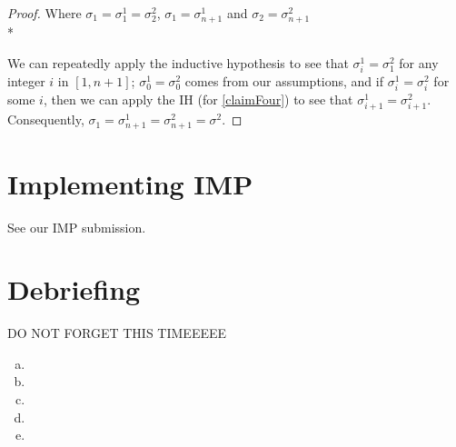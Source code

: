 \documentclass[10pt]{article}
\newcommand{\problem}[1]{\section{\sf #1}}
\begin{document}
\begin{enumerate}[(a)]
\begin{proof}
    Where $\sigma_1 = \sigma^1_1 = \sigma^2_2$, $\sigma_1 = \sigma^1_{n+1}$ and
    $\sigma_2 = \sigma^2_{n+1}$ \\*

    We can repeatedly apply the inductive hypothesis to see that $\sigma^1_i
    = \sigma^2_1$ for any integer $i$ in $[1, n+1]$; $\sigma^1_0 =
    \sigma^2_0$ comes from our assumptions, and if $\sigma^1_i = \sigma^2_i$
    for some $i$, then we can apply the IH (for \ref{claimFour}) to see that
    $\sigma^1_{i+1} = \sigma^2_{i+1}$. Consequently, $\sigma_1 = \sigma^1_{n+1}
    = \sigma^2_{n+1} = \sigma^2$.

  \end{proof}



\end{enumerate}
\problem{Implementing IMP} %
See our IMP submission.
\problem{Debriefing} %
DO NOT FORGET THIS TIMEEEEE

\begin{enumerate}[(a)]
  \item
  \item
  \item
  \item
  \item
\end{enumerate}
\end{document}
